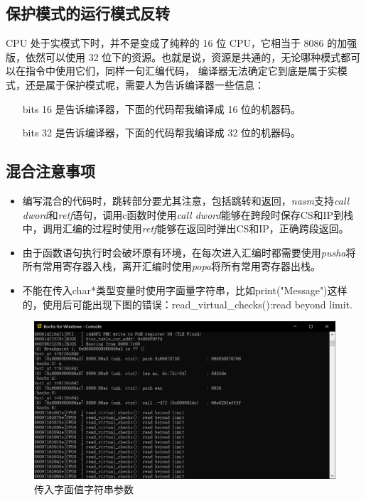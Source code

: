 \documentclass[a4paper, 11pt]{article} %
\begin{document}
\subsection{保护模式的运行模式反转}
CPU 处于实模式下时，并不是变成了纯粹的 16 位 CPU，它相当于 8086 的加强版，依然可以使用 32 位下的资源。也就是说，资源是共通的，无论哪种模式都可以在指令中使用它们，同样一句汇编代码，
编译器无法确定它到底是属于实模式，还是属于保护模式呢，需要人为告诉编译器一些信息：

\begin{itemize} 
  \item [bits 16]是告诉编译器，下面的代码帮我编译成 16 位的机器码。
  \item [bits 32]是告诉编译器，下面的代码帮我编译成 32 位的机器码。
\end{itemize}

\subsection{混合注意事项}
\begin{itemize} 
  \item 编写混合的代码时，跳转部分要尤其注意，包括跳转和返回，\textit{nasm}支持\textit{call dword}和\textit{retf}语句，调用c函数时使用\textit{call dword}能够在跨段时保存CS和IP到栈中，调用汇编的过程时使用\textit{retf}能够在返回时弹出CS和IP，正确跨段返回。
  \item 由于函数语句执行时会破坏原有环境，在每次进入汇编时都需要使用\textit{pusha}将所有常用寄存器入栈，离开汇编时使用\textit{popa}将所有常用寄存器出栈。
  \item 不能在传入char*类型变量时使用字面量字符串，比如print("Message")这样的，使用后可能出现下图的错误：read\_virtual\_checks():read   beyond limit.
\end{itemize}

\begin{figure}[H]
  \centering
  \includegraphics[width=0.8\linewidth]{strerror.png}
  \caption{传入字面值字符串参数}
  \label{fig:mixtest}
\end{figure}
\end{document}
